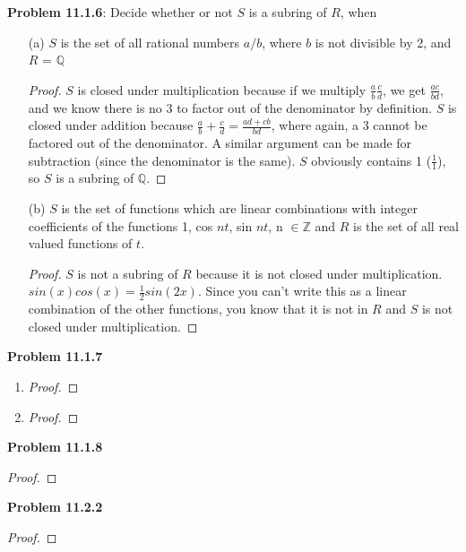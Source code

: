 \documentclass[12pt]{article}
\begin{document}
\textbf{Problem 11.1.6}: Decide whether or not $S$ is a subring of $R$, when
\begin{enumerate}
  \item[(a)] $S$ is the set of all rational numbers $a/b$, where $b$ is not divisible by 2, and $R$ = $\mathbb{Q}$
  \begin{proof}
    $S$ is closed under multiplication because if we multiply $\frac{a}{b}\frac{c}{d}$, we get $\frac{ac}{bd}$, and we know there is no 3 to factor out of the denominator by definition. $S$ is closed under addition because $\frac{a}{b} + \frac{c}{d} = \frac{ad + cb}{bd}$, where again, a 3 cannot be factored out of the denominator. A similar argument can be made for subtraction (since the denominator is the same). $S$ obviously contains 1 ($\frac{1}{1}$), so $S$ is a subring of $\mathbb{Q}$.
  \end{proof}
  \item[(b)] $S$ is the set of functions which are linear combinations with integer coefficients of the functions {1, cos $nt$, sin $nt$}, n $\in \mathbb{Z}$ and $R$ is the set of all real valued functions of $t$.
  \begin{proof}
    $S$ is not a subring of $R$ because it is not closed under multiplication. $sin(x)cos(x) = \frac{1}{2}sin(2x)$. Since you can't write this as a linear combination of the other functions, you know that it is not in $R$ and $S$ is not closed under multiplication.
  \end{proof}
\end{enumerate}

\textbf{Problem 11.1.7}
\begin{enumerate}
  \begin{enumerate}
    \item
    \begin{proof}
    \end{proof}
    \item
    \begin{proof}
    \end{proof}
  \end{enumerate}
\end{enumerate}

\textbf{Problem 11.1.8}
\begin{proof}

\end{proof}

\textbf{Problem 11.2.2}
\begin{proof}

\end{proof}
\end{document}
